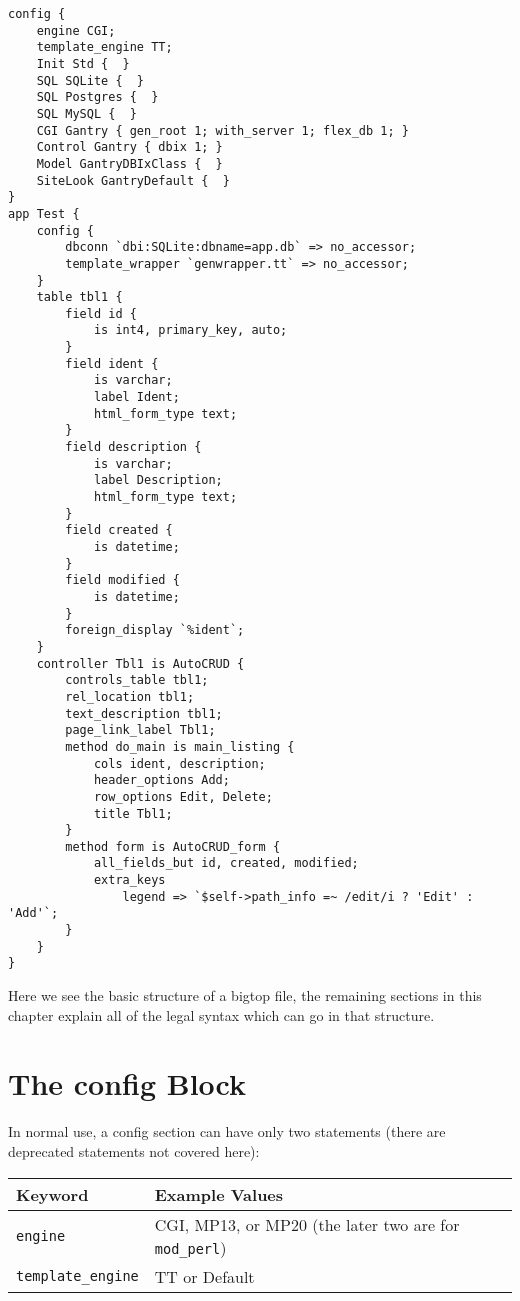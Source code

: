 \begin{verbatim}
config {
    engine CGI;
    template_engine TT;
    Init Std {  }
    SQL SQLite {  }
    SQL Postgres {  }
    SQL MySQL {  }
    CGI Gantry { gen_root 1; with_server 1; flex_db 1; }
    Control Gantry { dbix 1; }
    Model GantryDBIxClass {  }
    SiteLook GantryDefault {  }
}
app Test {
    config {
        dbconn `dbi:SQLite:dbname=app.db` => no_accessor;
        template_wrapper `genwrapper.tt` => no_accessor;
    }
    table tbl1 {
        field id {
            is int4, primary_key, auto;
        }
        field ident {
            is varchar;
            label Ident;
            html_form_type text;
        }
        field description {
            is varchar;
            label Description;
            html_form_type text;
        }
        field created {
            is datetime;
        }
        field modified {
            is datetime;
        }
        foreign_display `%ident`;
    }
    controller Tbl1 is AutoCRUD {
        controls_table tbl1;
        rel_location tbl1;
        text_description tbl1;
        page_link_label Tbl1;
        method do_main is main_listing {
            cols ident, description;
            header_options Add;
            row_options Edit, Delete;
            title Tbl1;
        }
        method form is AutoCRUD_form {
            all_fields_but id, created, modified;
            extra_keys
                legend => `$self->path_info =~ /edit/i ? 'Edit' : 'Add'`;
        }
    }
}
\end{verbatim}

Here we see the basic structure of a bigtop file, the remaining sections in
this chapter explain all of the legal syntax which can go in that structure.

\section{The config Block}

In normal use, a config section can have only two statements
(there are deprecated statements not covered here):

\begin{tabular}{l|l}
Keyword & Example Values \\
\hline
\verb+engine+ & CGI, MP13, or MP20 (the later two are for \verb+mod_perl+) \\
\verb+template_engine+ & TT or Default \\
\end{tabular}

